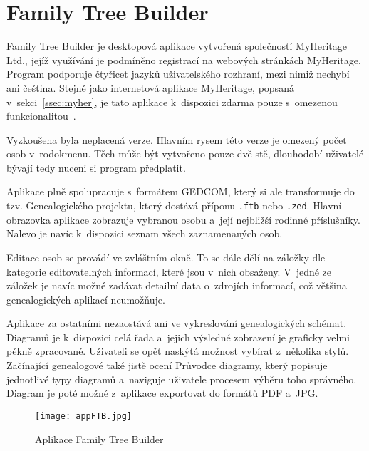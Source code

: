 		\section{Family Tree Builder}
		Family Tree Builder je desktopová aplikace vytvořená společností MyHeritage Ltd., jejíž využívání je podmíněno registrací na webových stránkách MyHeritage. Program podporuje čtyřicet jazyků uživatelského rozhraní, mezi nimiž nechybí ani čeština. Stejně jako internetová aplikace MyHeritage, popsaná v~sekci~\ref{ssec:myher}, je tato aplikace k~dispozici zdarma pouze s~omezenou funkcionalitou~\cite{bib:ApliFTB}. \par
		Vyzkoušena byla neplacená verze. Hlavním rysem této verze je omezený počet osob v~rodokmenu. Těch může být vytvořeno pouze dvě stě, dlouhodobí uživatelé bývají tedy nuceni si program předplatit. \par
		Aplikace plně spolupracuje s~formátem GEDCOM, který si ale transformuje do tzv. Genealogického projektu, který dostává příponu \texttt{.ftb} nebo \texttt{.zed}. 
		Hlavní obrazovka aplikace zobrazuje vybranou osobu a~její nejbližší rodinné příslušníky. Nalevo je navíc k~dispozici seznam všech zaznamenaných osob. \par
		Editace osob se provádí ve zvláštním okně. To se dále dělí na záložky dle kategorie editovatelných informací, které jsou v~nich obsaženy. V~jedné ze záložek je navíc možné zadávat detailní data o~zdrojích informací, což většina genealogických aplikací neumožňuje. \par
		Aplikace za ostatními nezaostává ani ve vykreslování genealogických schémat. Diagramů je k~dispozici celá řada a~jejich výsledné zobrazení je graficky velmi pěkně zpracované. Uživateli se opět naskýtá možnost vybírat z~několika stylů. Začínající genealogové také jistě ocení Průvodce diagramy, který popisuje jednotlivé typy diagramů a~naviguje uživatele procesem výběru toho správného. Diagram je poté možné z~aplikace exportovat do formátů PDF a~JPG. \par
		\begin{figure}[H]
			\centering
			\texttt{[image: appFTB.jpg]}
			\caption{Aplikace Family Tree Builder}
			\label{fig:appFTB}
		\end{figure}

